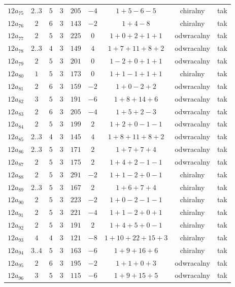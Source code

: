 \begin{longtable}{ccccccccc}
$12a_{75}$ & $2..3$ & $5$ & $3$ & $205$ & $-4$ & $1+5-6-5$ & chiralny & tak \\
$12a_{76}$ & $2$ & $6$ & $3$ & $143$ & $-2$ & $1+4-8$ & chiralny & tak \\
$12a_{77}$ & $2$ & $5$ & $3$ & $225$ & $0$ & $1+0+2+1+1$ & odwracalny & tak \\
$12a_{78}$ & $2..3$ & $4$ & $3$ & $149$ & $4$ & $1+7+11+8+2$ & odwracalny & tak \\
$12a_{79}$ & $2$ & $5$ & $3$ & $201$ & $0$ & $1-2+0+1+1$ & odwracalny & tak \\
$12a_{80}$ & $1$ & $5$ & $3$ & $173$ & $0$ & $1+1-1+1+1$ & chiralny & tak \\
$12a_{81}$ & $2$ & $6$ & $3$ & $159$ & $-2$ & $1+0-2+2$ & odwracalny & tak \\
$12a_{82}$ & $3$ & $5$ & $3$ & $191$ & $-6$ & $1+8+14+6$ & odwracalny & tak \\
$12a_{83}$ & $2$ & $6$ & $3$ & $205$ & $-4$ & $1+5+2-3$ & odwracalny & tak \\
$12a_{84}$ & $2$ & $5$ & $3$ & $199$ & $2$ & $1+2+0-1-1$ & odwracalny & tak \\
$12a_{85}$ & $2..3$ & $4$ & $3$ & $145$ & $4$ & $1+8+11+8+2$ & odwracalny & tak \\
$12a_{86}$ & $2..3$ & $5$ & $3$ & $171$ & $2$ & $1+7+7+4$ & odwracalny & tak \\
$12a_{87}$ & $2$ & $5$ & $3$ & $175$ & $2$ & $1+4+2-1-1$ & odwracalny & tak \\
$12a_{88}$ & $2$ & $5$ & $3$ & $291$ & $-2$ & $1+1-2+0-1$ & chiralny & tak \\
$12a_{89}$ & $2..3$ & $5$ & $3$ & $167$ & $2$ & $1+6+7+4$ & chiralny & tak \\
$12a_{90}$ & $2$ & $5$ & $3$ & $223$ & $-2$ & $1+0-2-1-1$ & chiralny & tak \\
$12a_{91}$ & $2$ & $5$ & $3$ & $221$ & $-4$ & $1+1-2+0+1$ & chiralny & tak \\
$12a_{92}$ & $2$ & $5$ & $3$ & $191$ & $2$ & $1+4+5+0-1$ & chiralny & tak \\
$12a_{93}$ & $4$ & $4$ & $3$ & $121$ & $-8$ & $1+10+22+15+3$ & chiralny & tak \\
$12a_{94}$ & $3..4$ & $5$ & $3$ & $163$ & $-6$ & $1+9+16+6$ & chiralny & tak \\
$12a_{95}$ & $2$ & $6$ & $3$ & $195$ & $-2$ & $1+1+0+3$ & odwracalny & tak \\
$12a_{96}$ & $3$ & $5$ & $3$ & $115$ & $-6$ & $1+9+15+5$ & odwracalny & tak \\

\end{longtable}
